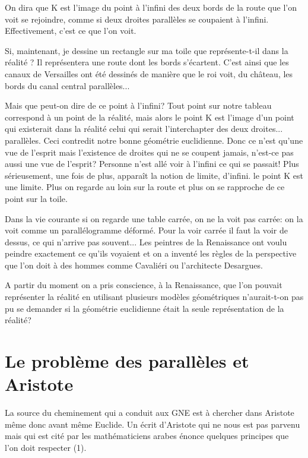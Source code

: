 \documentclass[a4paper, 12pt, twoside]{book}
\begin{document}
   

   On dira que K est l'image du point à l'infini des deux bords de la route que l'on voit se rejoindre, comme si deux droites parallèles se coupaient à l'infini. Effectivement, c'est ce que l'on voit.

   Si, maintenant, je dessine un rectangle sur ma toile que représente-t-il dans la réalité ? Il représentera une route dont les bords s'écartent. C'est ainsi que les canaux de Versailles ont été dessinés de manière que le roi voit, du château, les bords du canal central parallèles...

  Mais que peut-on dire de ce point à l'infini? Tout point sur notre tableau correspond à un point de la réalité, mais alors le point K est l'image d'un point qui existerait dans la réalité celui qui serait l'interchapter des deux droites... parallèles. Ceci contredit notre bonne géométrie euclidienne. Donc ce n'est qu'une vue de l'esprit mais l'existence de droites qui ne se coupent jamais, n'est-ce pas aussi une vue de l'esprit? Personne n'est allé voir à l'infini ce qui se passait! Plus sérieusement, une fois de plus, apparaît la notion de limite, d'infini. le point K est une limite. Plus on regarde au loin sur la route et plus on se rapproche de ce point sur la toile.

   Dans la vie courante si on regarde une table carrée, on ne la voit pas carrée: on la voit comme un parallélogramme déformé. Pour la voir carrée il faut la voir de dessus, ce qui n'arrive pas souvent... Les peintres de la Renaissance ont voulu peindre exactement ce qu'ils voyaient et on a inventé les règles de la perspective que l'on doit à des hommes comme Cavaliéri ou l'architecte Desargues.

  A partir du moment on a pris conscience, à la Renaissance, que l'on pouvait représenter la réalité en utilisant plusieurs modèles géométriques n'aurait-t-on pas pu se demander si la géométrie euclidienne était la seule représentation de la réalité?
  
  
  
\newpage \section{Le problème des parallèles et Aristote}\bigskip 

    La source du cheminement qui a conduit aux GNE est à chercher dans Aristote même donc avant même Euclide. Un écrit d'Aristote qui ne nous est pas parvenu mais qui est cité par les mathématiciens arabes énonce quelques principes que l'on doit respecter (1). \bigskip
    
\end{document}
